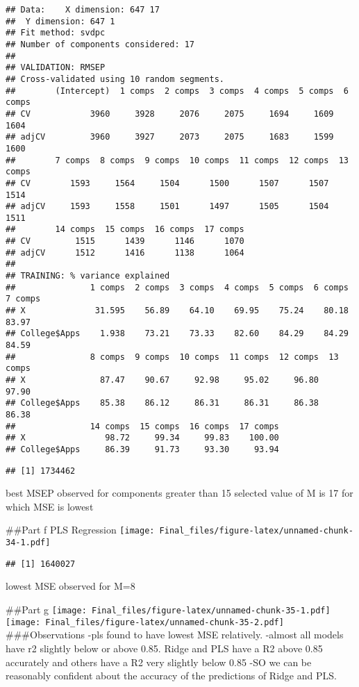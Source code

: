 \documentclass[
]{article}
\begin{document}
\begin{verbatim}
## Data:    X dimension: 647 17 
##  Y dimension: 647 1
## Fit method: svdpc
## Number of components considered: 17
## 
## VALIDATION: RMSEP
## Cross-validated using 10 random segments.
##        (Intercept)  1 comps  2 comps  3 comps  4 comps  5 comps  6 comps
## CV            3960     3928     2076     2075     1694     1609     1604
## adjCV         3960     3927     2073     2075     1683     1599     1600
##        7 comps  8 comps  9 comps  10 comps  11 comps  12 comps  13 comps
## CV        1593     1564     1504      1500      1507      1507      1514
## adjCV     1593     1558     1501      1497      1505      1504      1511
##        14 comps  15 comps  16 comps  17 comps
## CV         1515      1439      1146      1070
## adjCV      1512      1416      1138      1064
## 
## TRAINING: % variance explained
##               1 comps  2 comps  3 comps  4 comps  5 comps  6 comps  7 comps
## X              31.595    56.89    64.10    69.95    75.24    80.18    83.97
## College$Apps    1.938    73.21    73.33    82.60    84.29    84.29    84.59
##               8 comps  9 comps  10 comps  11 comps  12 comps  13 comps
## X               87.47    90.67     92.98     95.02     96.80     97.90
## College$Apps    85.38    86.12     86.31     86.31     86.38     86.38
##               14 comps  15 comps  16 comps  17 comps
## X                98.72     99.34     99.83    100.00
## College$Apps     86.39     91.73     93.30     93.94
\end{verbatim}

\begin{verbatim}
## [1] 1734462
\end{verbatim}

best MSEP observed for components greater than 15 selected value of M is
17 for which MSE is lowest

\#\#Part f PLS Regression
\texttt{[image: Final\_files/figure-latex/unnamed-chunk-34-1.pdf]}

\begin{verbatim}
## [1] 1640027
\end{verbatim}

lowest MSE observed for M=8

\#\#Part g
\texttt{[image: Final\_files/figure-latex/unnamed-chunk-35-1.pdf]}
\texttt{[image: Final\_files/figure-latex/unnamed-chunk-35-2.pdf]}
\#\#\#Observations -pls found to have lowest MSE relatively. -almost all
models have r2 slightly below or above 0.85. Ridge and PLS have a R2
above 0.85 accurately and others have a R2 very slightly below 0.85 -SO
we can be reasonably confident about the accuracy of the predictions of
Ridge and PLS.
\end{document}

